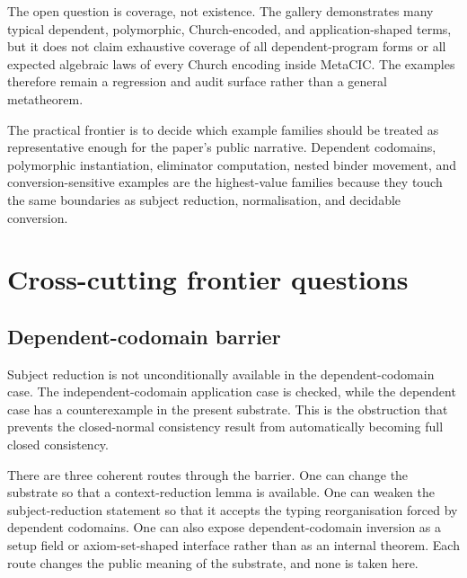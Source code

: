 The open question is coverage, not existence. The gallery demonstrates many
typical dependent, polymorphic, Church-encoded, and application-shaped terms,
but it does not claim exhaustive coverage of all dependent-program forms or all
expected algebraic laws of every Church encoding inside MetaCIC. The examples
therefore remain a regression and audit surface rather than a general
metatheorem.

The practical frontier is to decide which example families should be treated
as representative enough for the paper's public narrative. Dependent
codomains, polymorphic instantiation, eliminator computation, nested binder
movement, and conversion-sensitive examples are the highest-value families
because they touch the same boundaries as subject reduction, normalisation, and
decidable conversion.


\section{Cross-cutting frontier questions}
\label{sec:metacic-open-problems-cross-cutting}

\subsection{Dependent-codomain barrier}
\label{subsec:metacic-open-problems-dependent-codomain}

Subject reduction is not unconditionally available in the dependent-codomain
case. The independent-codomain application case is checked, while the dependent
case has a counterexample in the present substrate. This is the obstruction
that prevents the closed-normal consistency result from automatically becoming
full closed consistency.

There are three coherent routes through the barrier. One can change the
substrate so that a context-reduction lemma is available. One can weaken the
subject-reduction statement so that it accepts the typing reorganisation
forced by dependent codomains. One can also expose dependent-codomain inversion
as a setup field or axiom-set-shaped interface rather than as an internal
theorem. Each route changes the public meaning of the substrate, and none is
taken here.

